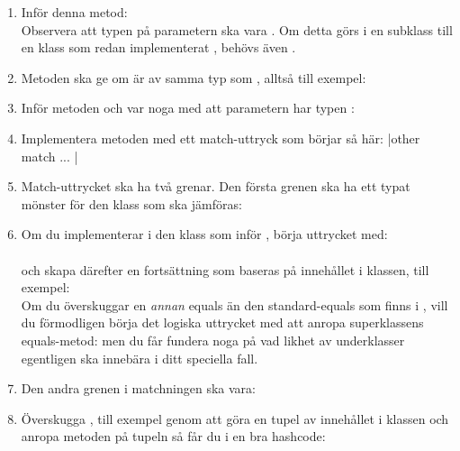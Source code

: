 \begin{enumerate}[leftmargin=*]
\item Inför denna metod: \\Observera att typen på parametern ska vara . Om detta görs i en subklass till en klass som redan implementerat , behövs även .

\item Metoden  ska ge  om  är av samma typ som , alltså till exempel: \\

\item Inför metoden  och var noga med att parametern har typen : \\ 

\item Implementera metoden  med ett match-uttryck som börjar så här: 
\code|other match { ... } |

\item Match-uttrycket ska ha två grenar. Den första grenen ska ha ett typat mönster för den klass som ska jämföras: \\ 

\item Om du implementerar  i den klass som inför , börja uttrycket med: \\  \\ 
och skapa därefter en fortsättning som baseras på innehållet i klassen, till exempel:  \\
Om du överskuggar en \textit{annan} equals än den standard-equals som finns i , vill du förmodligen börja det logiska uttrycket med att anropa superklassens equals-metod: 
  men du får fundera noga på vad likhet av underklasser egentligen ska innebära i ditt speciella fall. 
 
\item Den andra grenen i matchningen ska vara: 

\item Överskugga , till exempel genom att göra en tupel av innehållet i klassen och anropa metoden \code{##} på tupeln så får du i en bra hashcode: \\

\end{enumerate}


